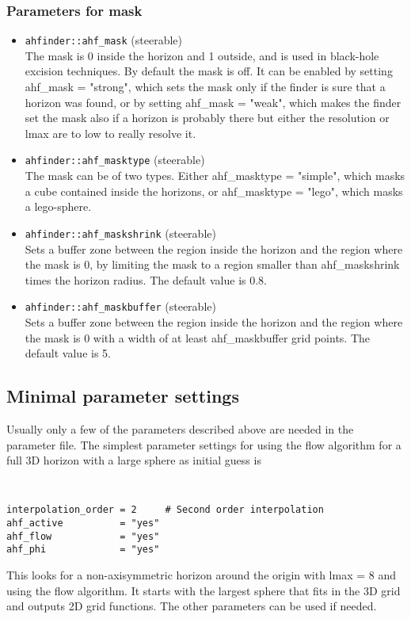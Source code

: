 \subsubsection*{Parameters for mask}
\begin{itemize}
\item {\tt ahfinder::ahf\_mask} (steerable) \\
        The mask is 0 inside the horizon and 1 outside, and is used in
        black-hole excision techniques. By default the mask is off. It
        can be enabled by setting ahf\_mask = "strong", which sets the mask
        only if the finder is sure that a horizon was found, or by setting
        ahf\_mask = "weak", which makes the finder set the mask also if a
        horizon is probably there but either the resolution or lmax are to
        low to really resolve it.
\item {\tt ahfinder::ahf\_masktype} (steerable) \\
        The mask can be of two types. Either ahf\_masktype = "simple",
        which masks a cube contained inside the horizons, or ahf\_masktype
        = "lego", which masks a lego-sphere.
\item {\tt ahfinder::ahf\_maskshrink} (steerable) \\
        Sets a buffer zone between the region inside the horizon and the
        region where the mask is 0, by limiting the mask to a region smaller
        than ahf\_maskshrink times the horizon radius. The default value
        is 0.8.
\item {\tt ahfinder::ahf\_maskbuffer} (steerable) \\
        Sets a buffer zone between the region inside the horizon and the
        region where the mask is 0 with a width of at least ahf\_maskbuffer
        grid points. The default value is 5.
\end{itemize}
\subsection{Minimal parameter settings}
Usually only a few of the parameters described above are needed in the
parameter file. The simplest parameter settings for using the flow
algorithm for a full 3D horizon with a large sphere as initial guess is
{\tt
\begin{verbatim}
interpolation_order = 2     # Second order interpolation
ahf_active          = "yes"
ahf_flow            = "yes"
ahf_phi             = "yes"
\end{verbatim}
}
This looks for a non-axisymmetric horizon around the origin with lmax = 8
and using the flow algorithm. It starts with the largest sphere that fits
in the 3D grid and outputs 2D grid functions. The other parameters can be
used if needed.

